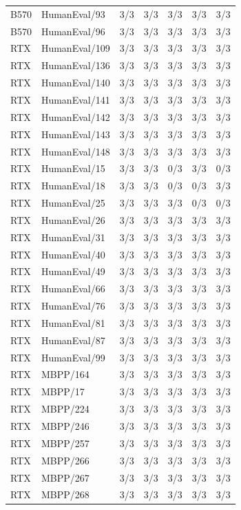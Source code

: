 \begin{longtable}{@{}llrrrrr@{}}
B570 & HumanEval/93 & 3/3 & 3/3 & 3/3 & 3/3 & 3/3 \\
B570 & HumanEval/96 & 3/3 & 3/3 & 3/3 & 3/3 & 3/3 \\
RTX & HumanEval/109 & 3/3 & 3/3 & 3/3 & 3/3 & 3/3 \\
RTX & HumanEval/136 & 3/3 & 3/3 & 3/3 & 3/3 & 3/3 \\
RTX & HumanEval/140 & 3/3 & 3/3 & 3/3 & 3/3 & 3/3 \\
RTX & HumanEval/141 & 3/3 & 3/3 & 3/3 & 3/3 & 3/3 \\
RTX & HumanEval/142 & 3/3 & 3/3 & 3/3 & 3/3 & 3/3 \\
RTX & HumanEval/143 & 3/3 & 3/3 & 3/3 & 3/3 & 3/3 \\
RTX & HumanEval/148 & 3/3 & 3/3 & 3/3 & 3/3 & 3/3 \\
RTX & HumanEval/15 & 3/3 & 3/3 & 0/3 & 3/3 & 0/3 \\
RTX & HumanEval/18 & 3/3 & 3/3 & 0/3 & 0/3 & 3/3 \\
RTX & HumanEval/25 & 3/3 & 3/3 & 3/3 & 0/3 & 0/3 \\
RTX & HumanEval/26 & 3/3 & 3/3 & 3/3 & 3/3 & 3/3 \\
RTX & HumanEval/31 & 3/3 & 3/3 & 3/3 & 3/3 & 3/3 \\
RTX & HumanEval/40 & 3/3 & 3/3 & 3/3 & 3/3 & 3/3 \\
RTX & HumanEval/49 & 3/3 & 3/3 & 3/3 & 3/3 & 3/3 \\
RTX & HumanEval/66 & 3/3 & 3/3 & 3/3 & 3/3 & 3/3 \\
RTX & HumanEval/76 & 3/3 & 3/3 & 3/3 & 3/3 & 3/3 \\
RTX & HumanEval/81 & 3/3 & 3/3 & 3/3 & 3/3 & 3/3 \\
RTX & HumanEval/87 & 3/3 & 3/3 & 3/3 & 3/3 & 3/3 \\
RTX & HumanEval/99 & 3/3 & 3/3 & 3/3 & 3/3 & 3/3 \\
RTX & MBPP/164 & 3/3 & 3/3 & 3/3 & 3/3 & 3/3 \\
RTX & MBPP/17 & 3/3 & 3/3 & 3/3 & 3/3 & 3/3 \\
RTX & MBPP/224 & 3/3 & 3/3 & 3/3 & 3/3 & 3/3 \\
RTX & MBPP/246 & 3/3 & 3/3 & 3/3 & 3/3 & 3/3 \\
RTX & MBPP/257 & 3/3 & 3/3 & 3/3 & 3/3 & 3/3 \\
RTX & MBPP/266 & 3/3 & 3/3 & 3/3 & 3/3 & 3/3 \\
RTX & MBPP/267 & 3/3 & 3/3 & 3/3 & 3/3 & 3/3 \\
RTX & MBPP/268 & 3/3 & 3/3 & 3/3 & 3/3 & 3/3 \\

\end{longtable}
